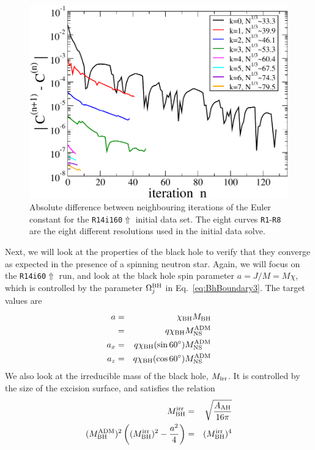 \begin{figure}
\includegraphics[width=0.95\columnwidth]{chap4/EulerConv}
\caption[Convergence of the Euler constant for the {\tt R14160$\Uparrow$}]{\label{Fig:EulerConv}
Absolute difference between neighbouring iterations of the Euler constant for the {\tt R14i160$\Uparrow$} initial data set. The eight curves {\tt R1}-{\tt R8} are the eight different resolutions
used in the initial data solve.}
\end{figure}

Next, we will look at the properties of the black hole to verify that they converge as expected in the presence of a spinning neutron star. Again, we will focus on the {\tt R14i60$\Uparrow$} run, and look at the black hole spin parameter $a=J/M=M\chi$, which is controlled by the parameter $\Omega_j^{\rm BH}$ in Eq.~\ref{eq:BhBoundary3}. The target values are
\begin{eqnarray}
a&=&\chi_{\rm BH}M_{\rm BH}\\
&=&q\chi_{\rm BH}M_{\rm NS}^{\rm ADM}\\
a_x&=&q\chi_{\rm BH}(\sin60^{\circ})M_{\rm NS}^{\rm ADM}\\
a_z&=&q\chi_{\rm BH}(\cos60^{\circ})M_{\rm NS}^{\rm ADM}
\end{eqnarray}
We also look at the irreducible mass of the black hole, $M_{\rm irr}$. It is controlled by the size of the excision surface, and satisfies the relation
\begin{eqnarray}
M_{\rm BH}^{\rm irr}&=&\sqrt{\frac{A_{\rm AH}}{16\pi}}\\
(M_{\rm BH}^{\rm ADM})^2\left((M_{\rm BH}^{\rm irr})^2-\frac{a^2}{4}\right)&=&(M_{\rm BH}^{\rm irr})^4
\end{eqnarray}


